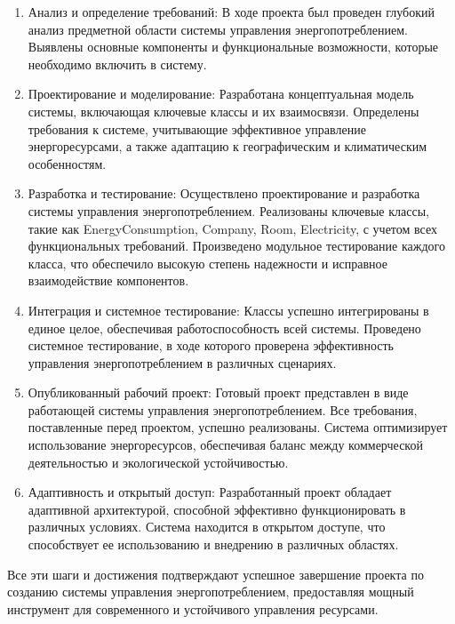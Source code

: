 \begin{enumerate}
\item Анализ и определение требований: В ходе проекта был проведен глубокий анализ предметной области системы управления энергопотреблением. Выявлены основные компоненты и функциональные возможности, которые необходимо включить в систему.

\item Проектирование и моделирование: Разработана концептуальная модель системы, включающая ключевые классы и их взаимосвязи. Определены требования к системе, учитывающие эффективное управление энергоресурсами, а также адаптацию к географическим и климатическим особенностям.

\item Разработка и тестирование: Осуществлено проектирование и разработка системы управления энергопотреблением. Реализованы ключевые классы, такие как EnergyConsumption, Company, Room, Electricity, с учетом всех функциональных требований. Произведено модульное тестирование каждого класса, что обеспечило высокую степень надежности и исправное взаимодействие компонентов.

\item Интеграция и системное тестирование: Классы успешно интегрированы в единое целое, обеспечивая работоспособность всей системы. Проведено системное тестирование, в ходе которого проверена эффективность управления энергопотреблением в различных сценариях.

\item Опубликованный рабочий проект: Готовый проект представлен в виде работающей системы управления энергопотреблением. Все требования, поставленные перед проектом, успешно реализованы. Система оптимизирует использование энергоресурсов, обеспечивая баланс между коммерческой деятельностью и экологической устойчивостью.

\item Адаптивность и открытый доступ: Разработанный проект обладает адаптивной архитектурой, способной эффективно функционировать в различных условиях. Система находится в открытом доступе, что способствует ее использованию и внедрению в различных областях.

\end{enumerate}

Все эти шаги и достижения подтверждают успешное завершение проекта по созданию системы управления энергопотреблением, предоставляя мощный инструмент для современного и устойчивого управления ресурсами.




